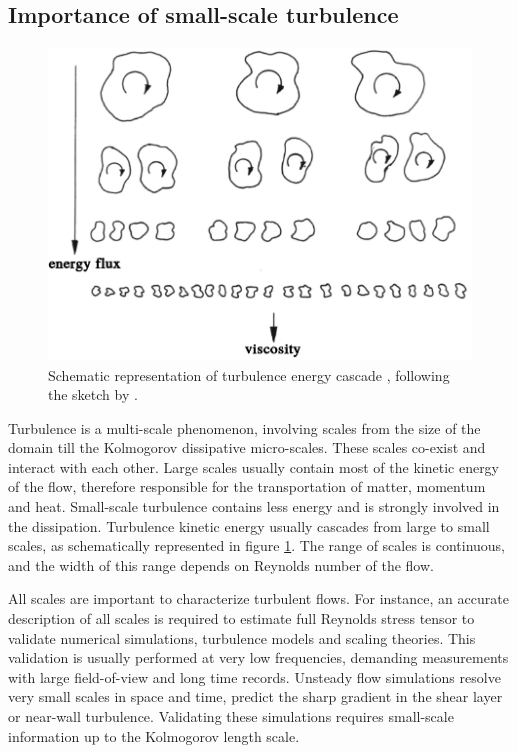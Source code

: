\subsection{Importance of small-scale turbulence}

\begin{figure}
\centering
	\includegraphics[width=0.75\columnwidth]{./images/probdef/turbulence/energycascade.png}
	\caption{\label{fig:energycascade} Schematic representation of turbulence energy cascade \citep{davidson2015turbulence}, following the sketch by \citet{frisch1995turbulence}.}
\end{figure}

Turbulence is a multi-scale phenomenon, involving scales from the size of the domain till the Kolmogorov dissipative micro-scales. These scales co-exist and interact with each other. Large scales usually contain most of the kinetic energy of the flow, therefore responsible for the transportation of matter, momentum and heat. Small-scale turbulence contains less energy and is strongly involved in the dissipation. Turbulence kinetic energy usually cascades from large to small scales, as schematically represented in figure \ref{fig:energycascade}. The range of scales is continuous, and the width of this range depends on Reynolds number of the flow. 
 
All scales are important to characterize turbulent flows. For instance, an accurate description of all scales is required to estimate full Reynolds stress tensor to validate numerical simulations, turbulence models and scaling theories. This validation is usually performed at very low frequencies, demanding measurements with large field-of-view and long time records. Unsteady flow simulations resolve very small scales in space and time, predict the sharp gradient in the shear layer or near-wall turbulence. Validating these simulations requires small-scale information up to the Kolmogorov length scale.

